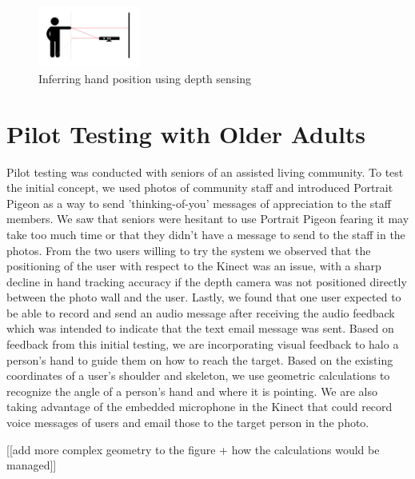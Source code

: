 \documentclass{chi-ext}
\begin{document}
\begin{figure}
    \centering
    \includegraphics[width=0.3\textwidth]{kinect_diag.png}
    \caption{Inferring hand position using depth sensing}
\end{figure}

\section{Pilot Testing with Older Adults}
Pilot testing was conducted with seniors of an assisted living community. To test the initial concept, we used photos of community staff and introduced Portrait Pigeon as a way to send 'thinking-of-you' messages of appreciation to the staff members. We saw that seniors were hesitant to use Portrait Pigeon fearing it may take too much time or that they didn't have a message to send to the staff in the photos. From the two users willing to try the system we observed that the positioning of the user with respect to the Kinect was an issue, with a sharp decline in hand tracking accuracy if the depth camera was not positioned directly between the photo wall and the user. Lastly, we found that one user expected to be able to record and send an audio message after receiving the audio feedback which was intended to indicate that the text email message was sent. Based on feedback from this initial testing, we are incorporating visual feedback to halo a person's hand to guide them on how to reach the target. Based on the existing coordinates of a user's shoulder and skeleton, we use geometric calculations to recognize the angle of a person's hand and where it is pointing. We are also taking advantage of the embedded microphone in the Kinect that could record voice messages of users and email those to the target person in the photo. 

[[add more complex geometry to the figure + how the calculations would be managed]]

\end{document}
